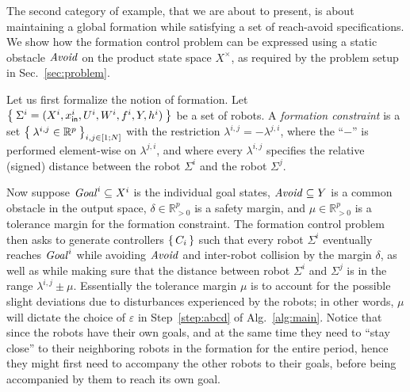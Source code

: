 The second category of example, that we are about to present, is about maintaining a global formation while satisfying a set of reach-avoid specifications.
We show how the formation control problem can be expressed using a static obstacle $\mathit{Avoid}$ on the product state space $X^\times$, as required by the problem setup in Sec.~\ref{sec:problem}.

Let us first formalize the notion of formation.
Let $\Set{\Sigma^i=(X^i,x_{\mathsf{in}}^i,U^i,W^i,f^i,Y,h^i)}$ be a set of robots.
A \emph{formation constraint} is a set $\Set{\lambda^{i,j}\in \mathbb{R}^p}_{i,j\in [1;N]}$ with the restriction $\lambda^{i,j}=-\lambda^{j,i}$, where the ``$-$'' is performed element-wise on $\lambda^{j,i}$, and where every $\lambda^{i,j}$ specifies the relative (signed) distance between the robot $\Sigma^i$ and the robot $\Sigma^j$.

Now suppose $\mathit{Goal}^i\subseteq X^i$ is the individual goal states, $\mathit{Avoid}\subseteq Y$ is a common obstacle in the output space, $\delta \in \mathbb{R}^p_{>0}$ is a safety margin, and $\mu\in \mathbb{R}^p_{>0}$ is a tolerance margin for the formation constraint.
The formation control problem then asks to generate controllers $\set{C_i}$ such that every robot $\Sigma^i$ eventually reaches $\mathit{Goal}^i$ while avoiding $\mathit{Avoid}$ and inter-robot collision by the margin $\delta$, as well as while making sure that the distance between robot $\Sigma^i$ and $\Sigma^j$ is in the range $\lambda^{i,j} \pm \mu$.
Essentially the tolerance margin $\mu$ is to account for the possible slight deviations due to disturbances experienced by the robots; in other words, $\mu$ will dictate the choice of $\varepsilon$ in Step~\ref{step:abcd} of Alg.~\ref{alg:main}.
Notice that since the robots have their own goals, and at the same time they need to ``stay close'' to their neighboring robots in the formation for the entire period, hence they might first need to accompany the other robots to their goals, before being accompanied by them to reach its own goal.

